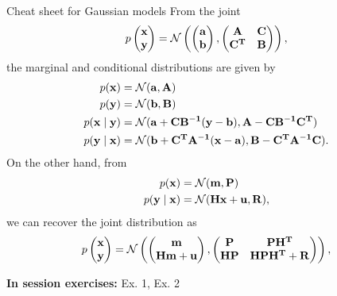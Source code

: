\documentclass[11pt, a4paper]{article}
\begin{document}
\begin{thbox}{Cheat sheet for Gaussian models}
From the joint 
\[
p
\begin{pmatrix}
    \mathbf{x}\\
    \mathbf{y}
\end{pmatrix}
= \mathcal{N}
\begin{pmatrix}
    \begin{pmatrix}
        \mathbf{a}\\
        \mathbf{b}
    \end{pmatrix},
    \begin{pmatrix}
        \mathbf{A} & \mathbf{C}\\
        \mathbf{C^T} & \mathbf{B}
    \end{pmatrix}
\end{pmatrix},
\]
the marginal and conditional distributions are given by
\begin{align*}
    p(\mathbf{x}) &= \mathcal{N}(\mathbf{a}, \mathbf{A})\\
    p(\mathbf{y}) &= \mathcal{N}(\mathbf{b}, \mathbf{B})\\
    p(\mathbf{x \mid y}) &= \mathcal{N}(\mathbf{a + CB^{-1}(y - b)}, \mathbf{A - CB^{-1}C^T})\\
    p(\mathbf{y \mid x}) &= \mathcal{N}(\mathbf{b + C^T A^{-1}(x - a)}, \mathbf{B - C^T A^{-1}C}).
\end{align*}
On the other hand, from 
\begin{align*}
    p(\mathbf{x}) &= \mathcal{N}(\mathbf{m}, \mathbf{P})\\
    p(\mathbf{y \mid x}) &= \mathcal{N}(\mathbf{Hx + u}, \mathbf{R}),
\end{align*}
we can recover the joint distribution as
\[
p
\begin{pmatrix}
    \mathbf{x}\\
    \mathbf{y}
\end{pmatrix}
= \mathcal{N}
\begin{pmatrix}
    \begin{pmatrix}
        \mathbf{m}\\
        \mathbf{Hm + u}
    \end{pmatrix},
    \begin{pmatrix}
        \mathbf{P} & \mathbf{PH^T}\\
        \mathbf{HP} & \mathbf{HPH^T + R}
    \end{pmatrix}
\end{pmatrix},
\]
\end{thbox}
\textbf{In session exercises:} Ex. 1, Ex. 2
\newpage
\end{document}
